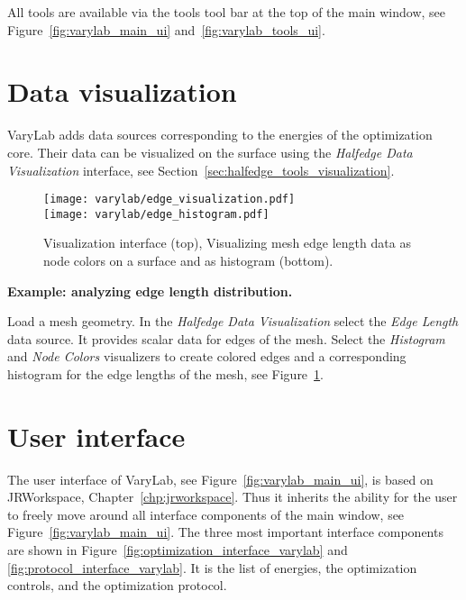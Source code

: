 \documentclass[Thesis.tex]{subfiles}
\begin{document}
All tools are available via the tools tool bar at the top of the main window, see Figure~\ref{fig:varylab_main_ui} and~\ref{fig:varylab_tools_ui}.

\section{Data visualization}

{\sc VaryLab} adds data sources corresponding to the energies of the optimization core. Their data can be visualized on the surface using the \emph{Halfedge Data Visualization} interface, see Section~\ref{sec:halfedge_tools_visualization}. 

\begin{figure}
    \begin{center}
    \texttt{[image: varylab/edge\_visualization.pdf]}\\
    \vspace{1mm}
    \texttt{[image: varylab/edge\_histogram.pdf]}    
    \caption{Visualization interface (top), Visualizing mesh edge length data as node colors on a surface and as histogram (bottom).}
    \label{fig:visualizing_edge_lengths}
    \end{center}
\end{figure}

{\bf Example: analyzing edge length distribution.}
\nopagebreak

Load a mesh geometry. In the \emph{Halfedge Data Visualization} select the \emph{Edge Length} data source. It provides scalar data for edges of the mesh. Select the \emph{Histogram} and \emph{Node Colors} visualizers to create colored edges and a corresponding histogram for the edge lengths of the mesh, see Figure~\ref{fig:visualizing_edge_lengths}.


\section{User interface}
\label{sec:ui_varylab}

The user interface of {\sc VaryLab}, see Figure~\ref{fig:varylab_main_ui}, is based on {\sc JRWorkspace}, Chapter~\ref{chp:jrworkspace}. Thus it inherits the ability for the user to freely move around all interface components of the main window, see Figure~\ref{fig:varylab_main_ui}. 
The three most important interface components are shown in Figure~\ref{fig:optimization_interface_varylab} and \ref{fig:protocol_interface_varylab}. It is the list of energies, the optimization controls, and the optimization protocol.
\end{document}
